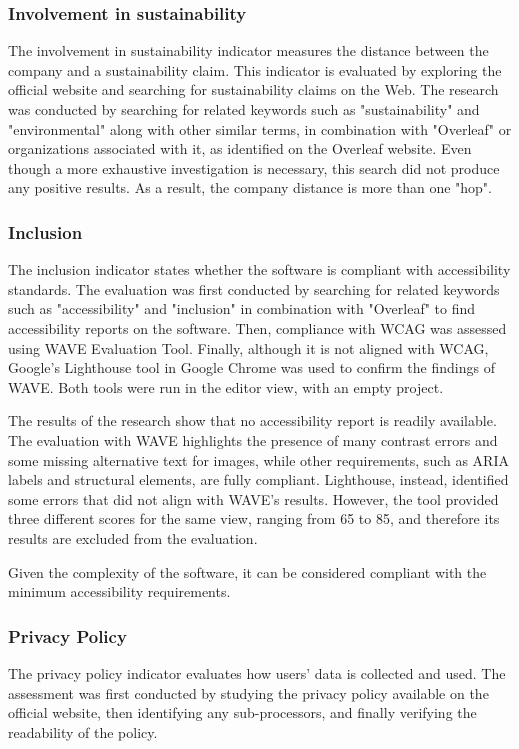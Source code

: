\subsubsection{Involvement in sustainability}
The involvement in sustainability indicator measures the distance between the company and a sustainability claim. This indicator is evaluated by exploring the official website and searching for sustainability claims on the Web. The research was conducted by searching for related keywords such as "sustainability" and "environmental" along with other similar terms, in combination with "Overleaf" or organizations associated with it, as identified on the Overleaf website. Even though a more exhaustive investigation is necessary, this search did not produce any positive results. As a result, the company distance is more than one "hop".

\subsubsection{Inclusion}
The inclusion indicator states whether the software is compliant with accessibility standards. The evaluation was first conducted by searching for related keywords such as "accessibility" and "inclusion" in combination with "Overleaf" to find accessibility reports on the software. Then, compliance with WCAG was assessed using WAVE Evaluation Tool. Finally, although it is not aligned with WCAG, Google's Lighthouse tool in Google Chrome was used to confirm the findings of WAVE. Both tools were run in the editor view, with an empty project.

The results of the research show that no accessibility report is readily available. The evaluation with WAVE highlights the presence of many contrast errors and some missing alternative text for images, while other requirements, such as ARIA labels and structural elements, are fully compliant. Lighthouse, instead, identified some errors that did not align with WAVE's results. However, the tool provided three different scores for the same view, ranging from 65 to 85, and therefore its results are excluded from the evaluation.

Given the complexity of the software, it can be considered compliant with the minimum accessibility requirements.

\subsubsection{Privacy Policy}
The privacy policy indicator evaluates how users' data is collected and used. The assessment was first conducted by studying the privacy policy available on the official website, then identifying any sub-processors, and finally verifying the readability of the policy. 

